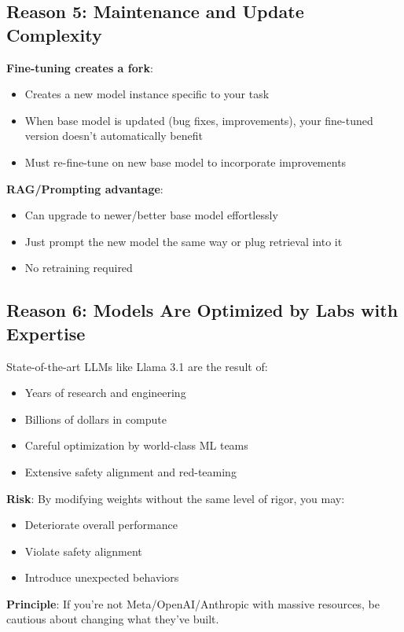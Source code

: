 \documentclass{article}
\begin{document}
\subsection{Reason 5: Maintenance and Update Complexity}

\textbf{Fine-tuning creates a fork}:
\begin{itemize}
\item Creates a new model instance specific to your task
\item When base model is updated (bug fixes, improvements), your fine-tuned version doesn't automatically benefit
\item Must re-fine-tune on new base model to incorporate improvements
\end{itemize}

\textbf{RAG/Prompting advantage}:
\begin{itemize}
\item Can upgrade to newer/better base model effortlessly
\item Just prompt the new model the same way or plug retrieval into it
\item No retraining required
\end{itemize}

\subsection{Reason 6: Models Are Optimized by Labs with Expertise}

\begin{tcolorbox}[colback=yellow!5!white, colframe=orange!50!black, title=Trust the Experts]
State-of-the-art LLMs like Llama 3.1 are the result of:
\begin{itemize}
\item Years of research and engineering
\item Billions of dollars in compute
\item Careful optimization by world-class ML teams
\item Extensive safety alignment and red-teaming
\end{itemize}

\textbf{Risk}: By modifying weights without the same level of rigor, you may:
\begin{itemize}
\item Deteriorate overall performance
\item Violate safety alignment
\item Introduce unexpected behaviors
\end{itemize}

\textbf{Principle}: If you're not Meta/OpenAI/Anthropic with massive resources, be cautious about changing what they've built.
\end{tcolorbox}
\end{document}
